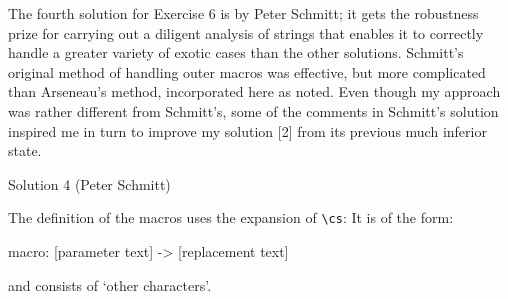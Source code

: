 The fourth solution for Exercise 6 is by Peter Schmitt; it gets the
robustness prize for carrying out a diligent analysis of \cmd{\meaning}
strings that enables it to correctly handle a greater variety of
exotic cases than the other solutions. Schmitt's original method of
handling outer macros was effective, but more complicated than
Arseneau's method, incorporated here as noted. Even though my
approach was rather different from Schmitt's, some of the comments in
Schmitt's solution inspired me in turn to improve my solution [2]
from its previous much inferior state.

\begin{solution}{Solution 4 (Peter Schmitt)}
\begin{lcode}
\end{lcode}

 The definition of the macros uses the expansion of
\cmd{\meaning}\verb?\cs?:
 It is of the form:
\begin{lcode}
     [..] macro: [parameter text] -> [replacement text]
\end{lcode}
 and consists of `other characters'.


\end{solution}
